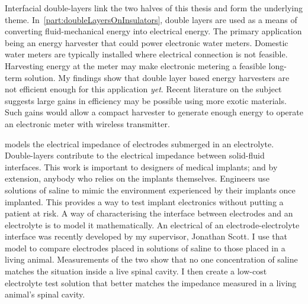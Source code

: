  Interfacial double-layers link the two halves of this thesis and form the underlying theme.
  In~\cref{part:doubleLayersOnInsulators}, double layers are used as a means of converting fluid-mechanical energy into electrical energy.
  The primary application being an energy harvester that could power electronic water meters.
  Domestic water meters are typically installed where electrical connection is not feasible.
  Harvesting energy at the meter may make electronic metering a feasible long-term solution.
  My findings show that double layer based energy harvesters are not efficient enough for this application \emph{yet}.
  Recent literature on the subject suggests large gains in efficiency may be possible using more exotic materials.
  Such gains would allow a compact harvester to generate enough energy to operate an electronic meter with wireless transmitter.

   models the electrical impedance of electrodes submerged in an electrolyte.
  Double-layers contribute to the electrical impedance between solid-fluid interfaces.
  This work is important to designers of medical implants; and by extension, anybody who relies on the implants themselves.
  Engineers use solutions of saline to mimic the environment experienced by their implants once implanted.
  This provides a way to test implant electronics without putting a patient at risk.
  A way of characterising the interface between electrodes and an electrolyte is to model it mathematically.
  An electrical of an electrode-electrolyte interface was recently developed by my supervisor, Jonathan Scott.
  I use that model to compare electrodes placed in solutions of saline to those placed in a living animal.
  Measurements of the two show that no one concentration of saline matches the situation inside a live spinal cavity.
  I then create a low-cost electrolyte test solution that better matches the impedance measured in a living animal's spinal cavity.



